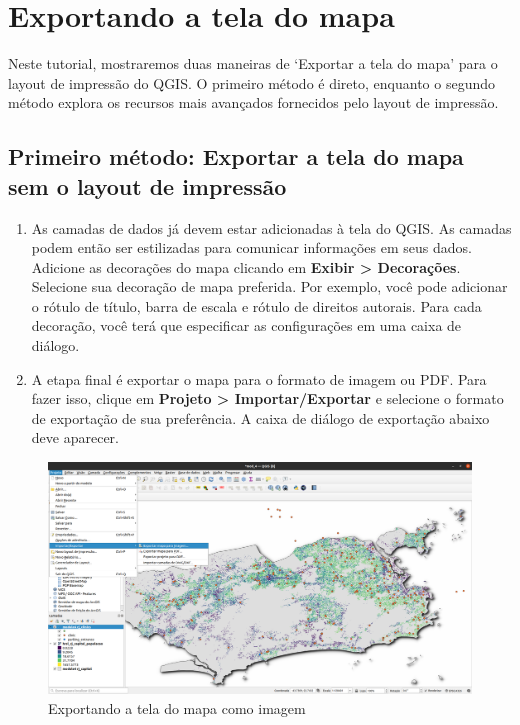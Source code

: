 \documentclass[
  portuguese,
]{krantz}
\providecommand{\tightlist}{%
  \setlength{\itemsep}{0pt}\setlength{\parskip}{0pt}}
\begin{document}
\hypertarget{exportando-a-tela-do-mapa}{%
\section{Exportando a tela do mapa}\label{exportando-a-tela-do-mapa}}

Neste tutorial, mostraremos duas maneiras de `Exportar a tela do mapa' para o layout de impressão do QGIS. O primeiro método é direto, enquanto o segundo método explora os recursos mais avançados fornecidos pelo layout de impressão.

\hypertarget{primeiro-muxe9todo-exportar-a-tela-do-mapa-sem-o-layout-de-impressuxe3o}{%
\subsection{\texorpdfstring{\textbf{Primeiro método: Exportar a tela do mapa sem o layout de impressão}}{Primeiro método: Exportar a tela do mapa sem o layout de impressão}}\label{primeiro-muxe9todo-exportar-a-tela-do-mapa-sem-o-layout-de-impressuxe3o}}

\begin{enumerate}
\def\labelenumi{\arabic{enumi}.}
\tightlist
\item
  As camadas de dados já devem estar adicionadas à tela do QGIS. As camadas podem então ser estilizadas para comunicar informações em seus dados. Adicione as decorações do mapa clicando em \textbf{Exibir \textgreater{} Decorações}. Selecione sua decoração de mapa preferida. Por exemplo, você pode adicionar o rótulo de título, barra de escala e rótulo de direitos autorais. Para cada decoração, você terá que especificar as configurações em uma caixa de diálogo.
\item
  A etapa final é exportar o mapa para o formato de imagem ou PDF. Para fazer isso, clique em \textbf{Projeto \textgreater{} Importar/Exportar} e selecione o formato de exportação de sua preferência. A caixa de diálogo de exportação abaixo deve aparecer.
\end{enumerate}

\begin{figure}
\centering
\includegraphics{media/modulo5/export-map-canvas-image.png}
\caption{Exportando a tela do mapa como imagem}
\end{figure}
\end{document}
